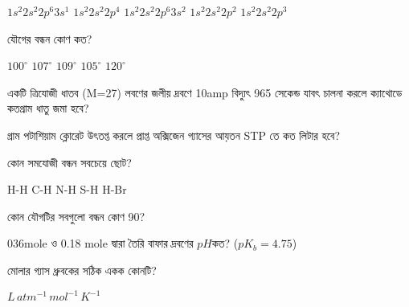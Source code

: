 \documentclass[addpoints]{exam}
\begin{document}
\begin{questions}
\begin{oneparchoices}
\choice $1s^{2}2s^{2}2p^{6}3s^{1}$
\choice $1s^{2}2s^{2}2p^{4}$
\choice $1s^{2}2s^{2}2p^{6}3s^{2}$
\choice $1s^{2}2s^{2}2p^{2}$
\choice $1s^{2}2s^{2}2p^{3}$
\end{oneparchoices}

\question  {} যৌগের  বন্ধন কোণ কত?
\begin{oneparchoices}
\choice $ 100^{\circ} $
\choice $ 107^{\circ} $
\choice $ 109^{\circ} $
\choice $ 105^{\circ} $
\choice $ 120^{\circ} $
\end{oneparchoices}

\question  একটি ত্রিযোজী ধাতব (M=27) লবণের জলীয় দ্রবণে 10amp বিদ্যুৎ 965 সেকেন্ড যাবৎ চালনা করলে ক্যাথোডে কতগ্রাম ধাতু জমা হবে?

\begin{oneparchoices}
\end{oneparchoices}

 গ্রাম পটাশিয়াম ক্লোরেট উৎতপ্ত করলে প্রাপ্ত অক্সিজেন গ্যাসের আয়তন STP তে কত লিটার হবে?

\begin{oneparchoices}
\end{oneparchoices}

\question  কোন সমযোজী বন্ধন সবচেয়ে ছোট?

\begin{oneparchoices}
\choice H-H
\choice C-H
\choice N-H
\choice S-H
\choice H-Br
\end{oneparchoices}

\question  কোন যৌগটির সবগুলো বন্ধন কোণ 90?

\begin{oneparchoices}
\choice  {}
\choice  {}
\choice  {}
\choice {}
\choice  {}
\end{oneparchoices}

\question  036mole  ও 0.18 mole  দ্বারা তৈরি বাফার দ্রবণের $ pH $কত? ($ pK_{b} = 4.75 $)

\begin{oneparchoices}
\end{oneparchoices}

\question   মোলার গ্যাস ধ্রুবকের সঠিক একক কোনটি?

\begin{oneparchoices}
\choice $L\,atm^{-1}\,mol^{-1}\,K^{-1}$\\


\end{oneparchoices}
\end{questions}
\end{document}

